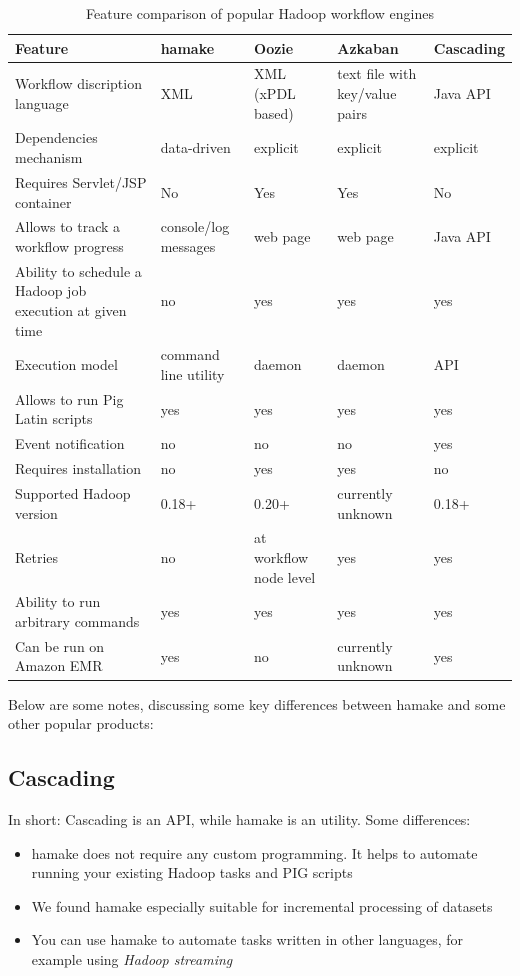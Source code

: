 \documentclass{article}
\begin{document}
\begin{table}
  \begin{tabular}{ | p{3cm} || l | l | l | l |}
    \hline
    \textbf{Feature} & \textbf{hamake} & \textbf{Oozie} & \textbf{Azkaban} & \textbf{Cascading} \\
    \hline
    Workflow discription language & XML & XML (xPDL based) & text file with key/value pairs & Java API \\
    Dependencies mechanism & data-driven & explicit & explicit & explicit \\
    Requires Servlet/JSP container & No & Yes & Yes & No \\
    Allows to track a workflow progress & console/log messages & web page & web page & Java API \\
    Ability to schedule a Hadoop job execution at given time & no & yes & yes & yes \\
    Execution model & command line utility & daemon & daemon & API \\
    Allows to run Pig Latin scripts & yes & yes & yes & yes \\
    Event notification & no & no & no & yes \\
    Requires installation & no & yes & yes & no \\
    Supported Hadoop version & 0.18+ & 0.20+ & currently unknown & 0.18+ \\
    Retries & no & at workflow node level & yes & yes \\
    Ability to run arbitrary commands & yes & yes & yes & yes \\
    Can be run on  Amazon EMR & yes & no & currently unknown & yes \\
    \hline
  \end{tabular}
  \caption{Feature comparison of popular Hadoop workflow engines }
  \label{table:1}
\end{table}

Below are some notes, discussing some key differences between hamake
and some other popular products:

\subsection{Cascading}

In short: Cascading is an API, while hamake is an utility. Some differences:
\begin{itemize}
\item hamake does not require any custom programming. It helps to automate running your existing Hadoop tasks and PIG scripts
\item We found hamake especially suitable for incremental processing of datasets
\item You can use hamake to automate tasks written in other languages, for example using \textit{Hadoop streaming}
\end{itemize}
\end{document}
